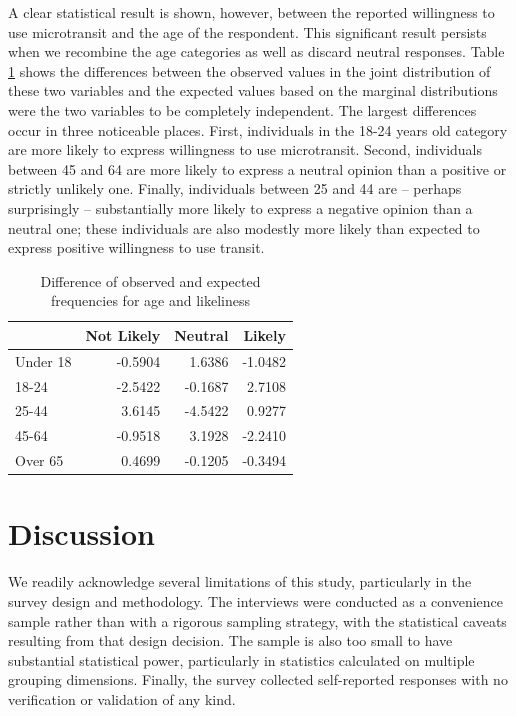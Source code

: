 \documentclass[smartcities,article,submit,moreauthors,pdftex]{mdpi}
\begin{document}
A clear statistical result is shown, however, between the reported willingness
to use microtransit and the age of the respondent. This significant result
persists when we recombine the age categories as well as discard neutral
responses. Table \ref{tab:age-difference} shows the differences between the
observed values in the joint distribution of these two variables and the
expected values based on the marginal distributions were the two variables to be
completely independent. The largest differences occur in three noticeable
places. First, individuals in the 18-24 years old category are more likely to
express willingness to use microtransit. Second, individuals between 45 and 64
are more likely to express a neutral opinion than a positive or strictly
unlikely one. Finally, individuals between 25 and 44 are -- perhaps surprisingly
-- substantially more likely to express a negative opinion than a neutral one;
these individuals are also modestly more likely than expected to express
positive willingness to use transit.

\begin{table}

\caption{\label{tab:age-difference}Difference of observed and expected frequencies for age and likeliness}
\centering
\begin{tabular}[t]{lrrr}
\toprule
  & Not Likely & Neutral & Likely\\
\midrule
Under 18 & -0.5904 & 1.6386 & -1.0482\\
18-24 & -2.5422 & -0.1687 & 2.7108\\
25-44 & 3.6145 & -4.5422 & 0.9277\\
45-64 & -0.9518 & 3.1928 & -2.2410\\
Over 65 & 0.4699 & -0.1205 & -0.3494\\
\bottomrule
\end{tabular}
\end{table}

\hypertarget{discussion}{%
\section{Discussion}\label{discussion}}

We readily acknowledge several limitations of this study, particularly in the
survey design and methodology. The interviews were conducted as a convenience
sample rather than with a rigorous sampling strategy, with the statistical
caveats resulting from that design decision. The sample is also too small to
have substantial statistical power, particularly in statistics calculated on
multiple grouping dimensions. Finally, the survey collected self-reported
responses with no verification or validation of any kind.
\end{document}
